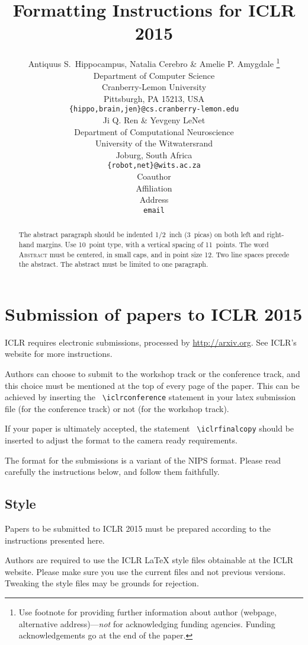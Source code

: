 \documentclass{article} %
\title{Formatting Instructions for ICLR 2015}
\author{
Antiquus S.~Hippocampus, Natalia Cerebro \& Amelie P. Amygdale \thanks{ Use footnote for providing further information
about author (webpage, alternative address)---\emph{not} for acknowledging
funding agencies.  Funding acknowledgements go at the end of the paper.} \\
Department of Computer Science\\
Cranberry-Lemon University\\
Pittsburgh, PA 15213, USA \\
\texttt{\{hippo,brain,jen\}@cs.cranberry-lemon.edu} \\
\And
Ji Q. Ren \& Yevgeny LeNet \\
Department of Computational Neuroscience \\
University of the Witwatersrand \\
Joburg, South Africa \\
\texttt{\{robot,net\}@wits.ac.za} \\
\AND
Coauthor \\
Affiliation \\
Address \\
\texttt{email} 
}
\begin{document}
\maketitle

\begin{abstract}
The abstract paragraph should be indented 1/2~inch (3~picas) on both left and
right-hand margins. Use 10~point type, with a vertical spacing of 11~points.
The word \textsc{Abstract} must be centered, in small caps, and in point size 12. Two
line spaces precede the abstract. The abstract must be limited to one
paragraph.
\end{abstract}

\section{Submission of papers to ICLR 2015}

ICLR requires electronic submissions, processed by
\url{http://arxiv.org}. See ICLR's website for more instructions.

Authors can choose to submit to the workshop track or the conference
track, and this choice must be mentioned at the top of every
page of the paper. This can be achieved by inserting the {\tt
  {\textbackslash}iclrconference} statement in your latex submission
file (for the conference track) or not (for the workshop track).

If your paper is ultimately accepted, the statement {\tt
  {\textbackslash}iclrfinalcopy} should be inserted to adjust the
format to the camera ready requirements.

The format for the submissions is a variant of the NIPS format.
Please read carefully the instructions below, and follow them
faithfully.

\subsection{Style}

Papers to be submitted to ICLR 2015 must be prepared according to the
instructions presented here.  


Authors are required to use the ICLR \LaTeX{} style files obtainable at the
ICLR website. Please make sure you use the current files and
not previous versions. Tweaking the style files may be grounds for rejection.
\end{document}
